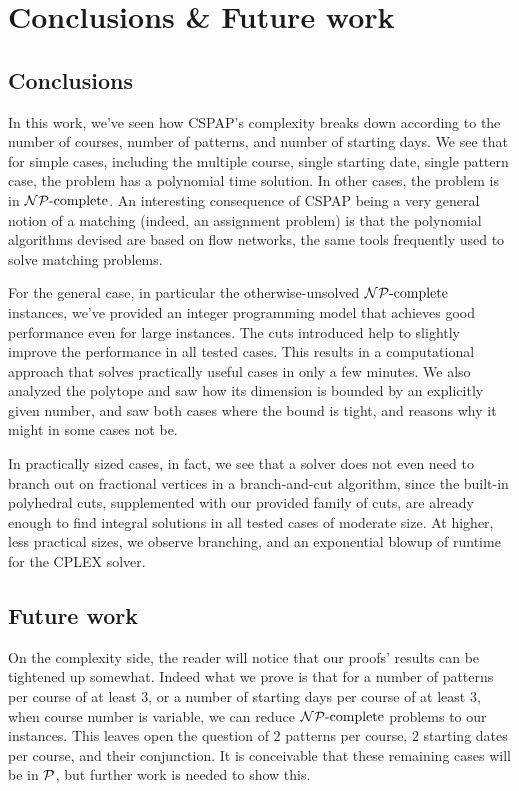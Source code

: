\chapter{Conclusions \& Future work}

\section{Conclusions}

In this work, we've seen how CSPAP's complexity breaks down according to the number of courses, number of patterns, and number of starting days. We see that for simple cases, including the multiple course, single starting date, single pattern case, the problem has a polynomial time solution. In other cases, the problem is in $\mathcal{NP}{\text{-complete}}$. An interesting consequence of CSPAP being a very general notion of a matching (indeed, an assignment problem) is that the polynomial algorithms devised are based on flow networks, the same tools frequently used to solve matching problems.

For the general case, in particular the otherwise-unsolved $\mathcal{NP}{\text{-complete}}$ instances, we've provided an integer programming model that achieves good performance even for large instances. The cuts introduced help to slightly improve the performance in all tested cases. This results in a computational approach that solves practically useful cases in only a few minutes. We also analyzed the polytope and saw how its dimension is bounded by an explicitly given number, and saw both cases where the bound is tight, and reasons why it might in some cases not be.

In practically sized cases, in fact, we see that a solver does not even need to branch out on fractional vertices in a branch-and-cut algorithm, since the built-in polyhedral cuts, supplemented with our provided family of cuts, are already enough to find integral solutions in all tested cases of moderate size. At higher, less practical sizes, we observe branching, and an exponential blowup of runtime for the CPLEX solver.

\section{Future work}

On the complexity side, the reader will notice that our proofs' results can be tightened up somewhat. Indeed what we prove is that for a number of patterns per course of at least $3$, or a number of starting days per course of at least $3$, when course number is variable, we can reduce $\mathcal{NP}{\text{-complete}}$ problems to our instances. This leaves open the question of $2$ patterns per course, $2$ starting dates per course, and their conjunction. It is conceivable that these remaining cases will be in $\mathcal{P}$, but further work is needed to show this.


